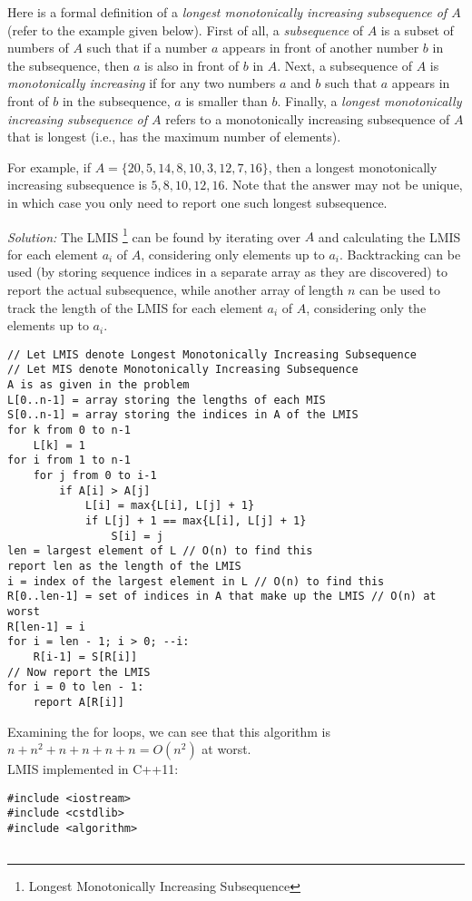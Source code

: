 \documentclass[11pt]{article}
\begin{document}
\begin{enumerate}
Here is a formal definition of a {\em longest
monotonically increasing subsequence of $A$} (refer to the
example given below). First of all, a {\em subsequence} of $A$ is a subset of numbers of
$A$ such that if a number $a$ appears in front of another number
$b$ in the subsequence, then $a$ is also in front of $b$ in $A$.
Next, a subsequence of $A$ is {\em monotonically increasing} if for any two
numbers $a$ and $b$ such that $a$ appears
in front of $b$ in the subsequence, $a$ is smaller than $b$.
Finally, a {\em longest
monotonically increasing subsequence of $A$} refers to a monotonically
increasing subsequence of $A$ that is longest (i.e., has the maximum number of elements).

For example, if $A=\{20,5,14,8,10,3,12,7,16\}$, then a longest monotonically increasing
subsequence is $5,8,10,12,16$. Note that the answer may not be unique,
in which case you only need to report one such longest subsequence.

\textit{Solution:} The LMIS \footnote{Longest Monotonically Increasing Subsequence} can be found by iterating over $A$ and calculating the LMIS for each element $a_i$ of $A$, considering only elements up to $a_i$. Backtracking can be used (by storing sequence indices in a separate array as they are discovered) to report the actual subsequence, while another array of length $n$ can be used to track the length of the LMIS for each element $a_i$ of $A$, considering only the elements up to $a_i$.
\begin{verbatim}
// Let LMIS denote Longest Monotonically Increasing Subsequence
// Let MIS denote Monotonically Increasing Subsequence
A is as given in the problem
L[0..n-1] = array storing the lengths of each MIS
S[0..n-1] = array storing the indices in A of the LMIS
for k from 0 to n-1
    L[k] = 1
for i from 1 to n-1
    for j from 0 to i-1
        if A[i] > A[j]
            L[i] = max{L[i], L[j] + 1}
            if L[j] + 1 == max{L[i], L[j] + 1}
                S[i] = j
len = largest element of L // O(n) to find this
report len as the length of the LMIS
i = index of the largest element in L // O(n) to find this
R[0..len-1] = set of indices in A that make up the LMIS // O(n) at worst
R[len-1] = i
for i = len - 1; i > 0; --i:
    R[i-1] = S[R[i]]
// Now report the LMIS
for i = 0 to len - 1:
    report A[R[i]]
\end{verbatim}
Examining the for loops, we can see that this algorithm is $n+n^2+n+n+n+n= O(n^2)$ at worst.\\
LMIS implemented in C++11:
\newpage
\begin{verbatim}
#include <iostream> 
#include <cstdlib> 
#include <algorithm>


\end{verbatim}
\end{enumerate}
\end{document}
